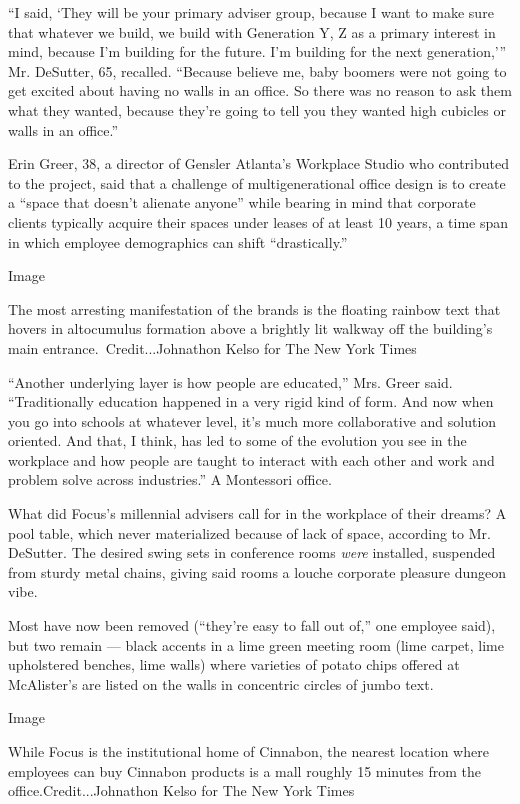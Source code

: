 ``I said, `They will be your primary adviser group, because I want to
make sure that whatever we build, we build with Generation Y, Z as a
primary interest in mind, because I'm building for the future. I'm
building for the next generation,''' Mr. DeSutter, 65, recalled.
``Because believe me, baby boomers were not going to get excited about
having no walls in an office. So there was no reason to ask them what
they wanted, because they're going to tell you they wanted high cubicles
or walls in an office.''

Erin Greer, 38, a director of Gensler Atlanta's Workplace Studio who
contributed to the project, said that a challenge of multigenerational
office design is to create a ``space that doesn't alienate anyone''
while bearing in mind that corporate clients typically acquire their
spaces under leases of at least 10 years, a time span in which employee
demographics can shift ``drastically.''

Image

The most arresting manifestation of the brands is the floating rainbow
text that hovers in altocumulus formation above a brightly lit walkway
off the building's main entrance.~Credit...Johnathon Kelso for The New
York Times

``Another underlying layer is how people are educated,'' Mrs. Greer
said. ``Traditionally education happened in a very rigid kind of form.
And now when you go into schools at whatever level, it's much more
collaborative and solution oriented. And that, I think, has led to some
of the evolution you see in the workplace and how people are taught to
interact with each other and work and problem solve across industries.''
A Montessori office.

What did Focus's millennial advisers call for in the workplace of their
dreams? A pool table, which never materialized because of lack of space,
according to Mr. DeSutter. The desired swing sets in conference rooms
\emph{were} installed, suspended from sturdy metal chains, giving said
rooms a louche corporate pleasure dungeon vibe.

Most have now been removed (``they're easy to fall out of,'' one
employee said), but two remain --- black accents in a lime green meeting
room (lime carpet, lime upholstered benches, lime walls) where varieties
of potato chips offered at McAlister's are listed on the walls in
concentric circles of jumbo text.

Image

While Focus is the institutional home of Cinnabon, the nearest location
where employees can buy Cinnabon products is a mall roughly 15 minutes
from the office.Credit...Johnathon Kelso for The New York Times


